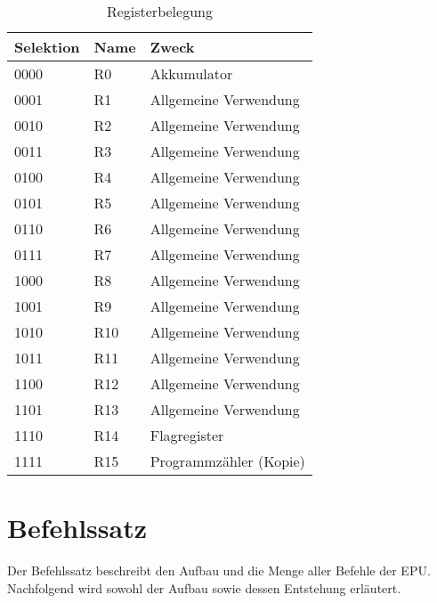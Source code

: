\begin{table}[h]
\centering
\begin{tabular}{lll}
\toprule
Selektion & Name & Zweck\\
\midrule
0000 & R0  & Akkumulator\\
0001 & R1  & Allgemeine Verwendung\\
0010 & R2  & Allgemeine Verwendung\\
0011 & R3  & Allgemeine Verwendung\\
0100 & R4  & Allgemeine Verwendung\\
0101 & R5  & Allgemeine Verwendung\\
0110 & R6  & Allgemeine Verwendung\\
0111 & R7  & Allgemeine Verwendung\\
1000 & R8  & Allgemeine Verwendung\\
1001 & R9  & Allgemeine Verwendung\\
1010 & R10 & Allgemeine Verwendung\\
1011 & R11 & Allgemeine Verwendung\\
1100 & R12 & Allgemeine Verwendung\\
1101 & R13 & Allgemeine Verwendung\\
1110 & R14 & Flagregister\\
1111 & R15 & Programmzähler (Kopie)\\
\bottomrule
\end{tabular}
\caption{Registerbelegung}
\label{tab:registerbelegung}
\end{table}
\pagebreak
\section{Befehlssatz}
\label{s:befehlssatz}
Der Befehlssatz beschreibt den Aufbau und die Menge aller Befehle der \ac{EPU}.
Nachfolgend wird sowohl der Aufbau sowie dessen Entstehung erläutert.

